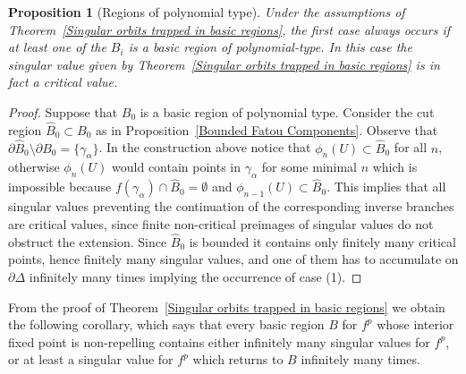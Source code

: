 \documentclass[11pt, twoside]{article}
\newtheorem{prop}[thm]{Proposition}
\theoremstyle{definition}
\newcommand{\dDe}{\partial\Delta}
\newcommand{\Bhat}{\widehat{B}}
\begin{document}
\begin{prop}[Regions of polynomial type] \label{case1forpoltype} Under the assumptions of Theorem~\ref{Singular orbits trapped in basic regions}, 
the first case always occurs if  at least one of the  $B_i$ is a basic region of polynomial-type. In this case  the singular value given by  Theorem~\ref{Singular orbits trapped in basic regions} is in fact a   \emph{critical} value.
\end{prop}
\begin{proof}
  Suppose that  $B_0$ is a basic region of polynomial type. 
Consider the cut region $\Bhat_0\subset B_0$ as in Proposition~\ref{Bounded Fatou Components}. Observe that $\partial\Bhat_0\setminus \partial B_0=\{\gamma_\alpha\}$. In the construction above notice that $\phi_n(U)\subset \Bhat_0$ for all $n$, otherwise $\phi_n(U)$ would contain points in $\gamma_\alpha$ for some minimal $n$ which is impossible because $f(\gamma_\alpha)\cap \Bhat_0=\emptyset$ and $\phi_{n-1}(U)\subset \Bhat_0$.  {This implies that all singular values preventing the continuation of the corresponding inverse branches  are critical values, since finite non-critical preimages of singular values do not obstruct the extension. Since $\Bhat_0$ is bounded it contains  only finitely many critical points,  hence finitely many singular values, and  one of them has to accumulate on $\dDe$ infinitely many times implying the occurrence of  case (1).}
\end{proof}

 From the proof of Theorem~\ref{Singular orbits trapped in basic regions} we obtain the following  corollary, which says that every  basic region $B$ for $f^p$ whose interior fixed point is non-repelling contains either infinitely many singular values for $f^p$, or at least a singular value for $f^p$ which returns to $B$ infinitely many times.
 
\end{document}
